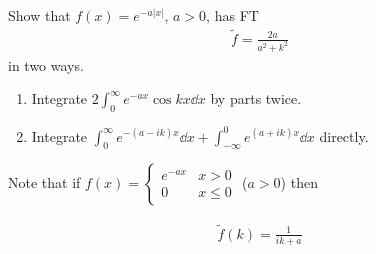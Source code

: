 \begin{exercise}
    Show that $f(x) = e^{-a |x|}$, $a > 0$, has FT
    \begin{align} \label{eq:8.6}
        \widetilde{f} = \frac{2a}{a^2 + k^2}
    \end{align} in two ways.
    \begin{enumerate}
        \item Integrate $2 \int_{0}^{\infty} e^{-ax} \cos kx \dd{x}$ by parts twice.
        \item Integrate $\int_{0}^{\infty} e^{-(a - ik) x} \dd{x} + \int_{-\infty}^{0} e^{(a + ik)x} \dd{x}$ directly.
    \end{enumerate}
    Note that if $f(x) = \begin{cases}
        e^{-ax} & x > 0 \\
        0 & x \leq 0
    \end{cases}$ ($a > 0$) then
    \addtocounter{equation}{-1}
    \begin{subequations}
        \begin{align} \label{eq:8.6a}
            \widetilde{f}(k) = \frac{1}{ik + a}
        \end{align}
    \end{subequations}
\end{exercise}

